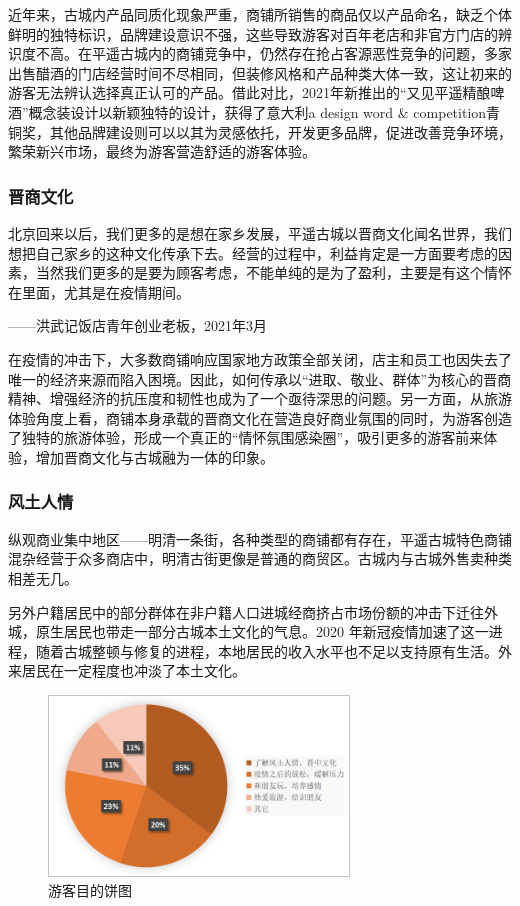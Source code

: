 \documentclass[UTF8]{ctexart}
\begin{document}
        近年来，古城内产品同质化现象严重，商铺所销售的商品仅以产品命名，缺乏个体鲜明的独特标识，品牌建设意识不强，这些导致游客对百年老店和非官方门店的辨识度不高。在平遥古城内的商铺竞争中，仍然存在抢占客源恶性竞争的问题，多家出售醋酒的门店经营时间不尽相同，但装修风格和产品种类大体一致，这让初来的游客无法辨认选择真正认可的产品。借此对比，2021年新推出的“又见平遥精酿啤酒”概念装设计以新颖独特的设计，获得了意大利a design word \& competition青铜奖，其他品牌建设则可以以其为灵感依托，开发更多品牌，促进改善竞争环境，繁荣新兴市场，最终为游客营造舒适的游客体验。
        \subsubsection{晋商文化}
        北京回来以后，我们更多的是想在家乡发展，平遥古城以晋商文化闻名世界，我们想把自己家乡的这种文化传承下去。经营的过程中，利益肯定是一方面要考虑的因素，当然我们更多的是要为顾客考虑，不能单纯的是为了盈利，主要是有这个情怀在里面，尤其是在疫情期间。
        
        \begin{flushright}
            ——洪武记饭店青年创业老板，2021年3月
        \end{flushright}

        在疫情的冲击下，大多数商铺响应国家地方政策全部关闭，店主和员工也因失去了唯一的经济来源而陷入困境。因此，如何传承以“进取、敬业、群体”为核心的晋商精神、增强经济的抗压度和韧性也成为了一个亟待深思的问题。另一方面，从旅游体验角度上看，商铺本身承载的晋商文化在营造良好商业氛围的同时，为游客创造了独特的旅游体验，形成一个真正的“情怀氛围感染圈”，吸引更多的游客前来体验，增加晋商文化与古城融为一体的印象。
        \subsubsection{风土人情}
        纵观商业集中地区——明清一条街，各种类型的商铺都有存在，平遥古城特色商铺混杂经营于众多商店中，明清古街更像是普通的商贸区。古城内与古城外售卖种类相差无几。
    
        另外户籍居民中的部分群体在非户籍人口进城经商挤占市场份额的冲击下迁往外城，原生居民也带走一部分古城本土文化的气息。2020 年新冠疫情加速了这一进程，随着古城整顿与修复的进程，本地居民的收入水平也不足以支持原有生活。外来居民在一定程度也冲淡了本土文化。
        \begin{figure}[H]
            \centering
            \includegraphics[width=8cm]{游客目的.png}
            \caption{游客目的饼图}
    
        \end{figure}
\end{document}
